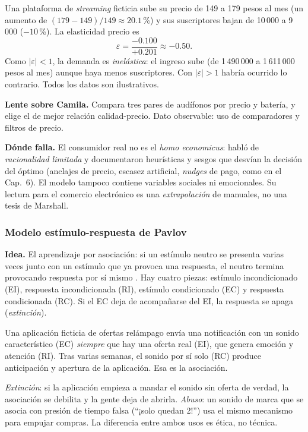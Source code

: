 \begin{cajaEjemplo}[title={Ejemplo 2: elasticidad de una suscripción}]
Una plataforma de \textit{streaming} ficticia sube su precio de 149 a 179
pesos al mes (un aumento de $(179-149)/149 \approx 20.1$\,\%) y sus suscriptores
bajan de 10\,000 a 9\,000 ($-10$\,\%). La elasticidad precio es
\[
  \varepsilon = \frac{-0.100}{+0.201} \approx -0.50.
\]
Como $|\varepsilon| < 1$, la demanda es \emph{inelástica}: el ingreso sube
(de 1\,490\,000 a 1\,611\,000 pesos al mes) aunque haya menos suscriptores. Con
$|\varepsilon|>1$ habría ocurrido lo contrario. Todos los datos son
ilustrativos.
\end{cajaEjemplo}

\textbf{Lente sobre Camila.} Compara tres pares de audífonos por precio y
batería, y elige el de mejor relación calidad-precio. Dato observable: uso de
comparadores y filtros de precio.

\textbf{Dónde falla.} El consumidor real no es el \emph{homo economicus}:
\textcite{simon1955} habló de \emph{racionalidad limitada} y
\textcite{tverskykahneman1974} documentaron heurísticas y sesgos que desvían la
decisión del óptimo (anclajes de precio, escasez artificial, \textit{nudges} de
pago, como en el Cap.~6). El modelo tampoco contiene variables sociales ni
emocionales. Su lectura para el comercio electrónico es una
\emph{extrapolación} de manuales, no una tesis de Marshall.

\subsubsection{Modelo estímulo-respuesta de Pavlov}
\label{sec:cap09-pavlov}

\textbf{Idea.} El aprendizaje por asociación: si un estímulo neutro se presenta
varias veces junto con un estímulo que ya provoca una respuesta, el neutro
termina provocando respuesta por sí mismo \parencite{pavlov1927}. Hay cuatro
piezas: estímulo incondicionado (EI), respuesta incondicionada (RI), estímulo
condicionado (EC) y respuesta condicionada (RC). Si el EC deja de acompañarse
del EI, la respuesta se apaga (\emph{extinción}).

\begin{cajaEjemplo}[title={Ejemplo: el sonido de la aplicación de ofertas}]
Una aplicación ficticia de ofertas relámpago envía una notificación con un sonido
característico (EC) \emph{siempre} que hay una oferta real (EI), que genera
emoción y atención (RI). Tras varias semanas, el sonido por sí solo (RC) produce
anticipación y apertura de la aplicación. Esa es la asociación.

\emph{Extinción}: si la aplicación empieza a mandar el sonido sin oferta
de verdad, la asociación se debilita y la gente deja de abrirla. \emph{Abuso}:
un sonido de marca que se asocia con presión de tiempo falsa (\enquote{¡solo
quedan 2!}) usa el mismo mecanismo para empujar compras. La diferencia entre
ambos usos es ética, no técnica.
\end{cajaEjemplo}

